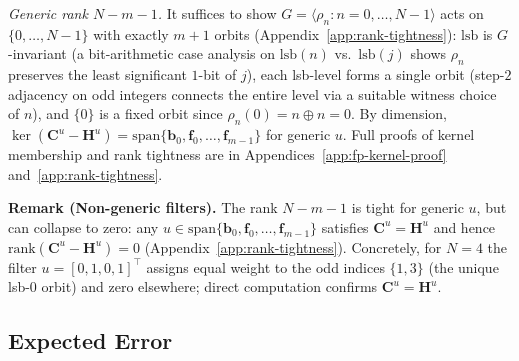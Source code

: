 \documentclass[10pt,a4paper]{amsart}
\begin{document}
\smallskip
\noindent\textit{Generic rank $N-m-1$.} It suffices to show $G=\langle\rho_n : n=0,\ldots,N-1\rangle$ acts on $\{0,\ldots,N-1\}$ with exactly $m+1$ orbits (Appendix~\ref{app:rank-tightness}): $\mathrm{lsb}$ is $G$-invariant (a bit-arithmetic case analysis on $\mathrm{lsb}(n)$ vs.\ $\mathrm{lsb}(j)$ shows $\rho_n$ preserves the least significant $1$-bit of $j$), each lsb-level forms a single orbit (step-$2$ adjacency on odd integers connects the entire level via a suitable witness choice of $n$), and $\{0\}$ is a fixed orbit since $\rho_n(0)=n\oplus n=0$. By dimension, $\ker(\mathbf{C}^u-\mathbf{H}^u)=\mathrm{span}\{\mathbf{b}_0,\mathbf{f}_0,\ldots,\mathbf{f}_{m-1}\}$ for generic $u$. Full proofs of kernel membership and rank tightness are in Appendices~\ref{app:fp-kernel-proof} and~\ref{app:rank-tightness}.

\medskip
\noindent\textbf{Remark (Non-generic filters).} The rank $N-m-1$ is tight for generic $u$, but can collapse to zero: any $u\in\mathrm{span}\{\mathbf{b}_0,\mathbf{f}_0,\ldots,\mathbf{f}_{m-1}\}$ satisfies $\mathbf{C}^u=\mathbf{H}^u$ and hence $\mathrm{rank}(\mathbf{C}^u-\mathbf{H}^u)=0$ (Appendix~\ref{app:rank-tightness}). Concretely, for $N=4$ the filter $u=[0,1,0,1]^\top$ assigns equal weight to the odd indices $\{1,3\}$ (the unique lsb-$0$ orbit) and zero elsewhere; direct computation confirms $\mathbf{C}^u=\mathbf{H}^u$.

\subsection{Expected Error}
\label{sec:expected-error}
\end{document}
